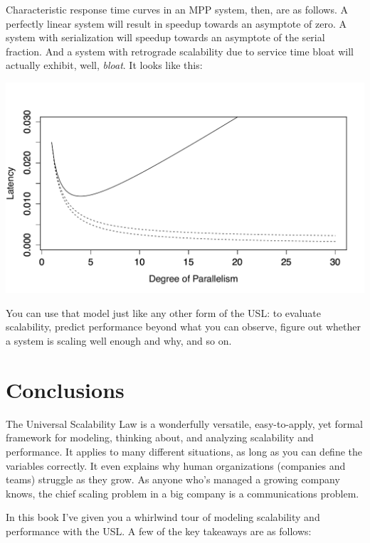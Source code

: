 \documentclass{vivid_layout}
\begin{document}
Characteristic response time curves in an MPP system, then, are as follows. A
perfectly linear system will result in speedup towards an asymptote of zero. A
system with serialization will speedup towards an asymptote of the serial
fraction. And a system with retrograde scalability due to service time bloat
will actually exhibit, well, {\itshape bloat}. It looks like this:
\begin{center}
\includegraphics[width=.85\linewidth]{scalability/mpp-speedup}
\end{center}

You can use that model just like any other form of the USL: to evaluate
scalability, predict performance beyond what you can observe, figure out whether
a system is scaling well enough and why, and so on.

\section{Conclusions}

The Universal Scalability Law is a wonderfully versatile, easy-to-apply, yet
formal framework for modeling, thinking about, and analyzing scalability and
performance. It applies to many different situations, as long as you can define
the variables correctly. It even explains why human organizations (companies and
teams) struggle as they grow. As anyone who's managed a growing company knows,
the chief scaling problem in a big company is a communications problem.

In this book I've given you a whirlwind tour of modeling scalability and
performance with the USL. A few of the key takeaways are as follows:
\end{document}
